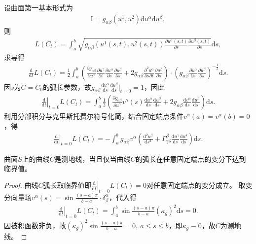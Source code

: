 \documentclass[../../main.tex]{subfiles}%
\begin{document}
设曲面第一基本形式为
\begin{align}
\mathrm{I}=g_{\alpha\beta}(u^1,u^2)\mathrm{d}u^\alpha\mathrm{d}u^\beta,
\end{align}
则
\begin{align}
L(C_t)=\int_{a}^{b}\sqrt{g_{\alpha\beta}(u^1(s,t),u^2(s,t))\frac{\partial u^\alpha(s,t)}{\partial s}\frac{\partial u^\beta(s,t)}{\partial s}}\mathrm{d}s,
\end{align}
求导得
\begin{align*}
\frac{\mathrm{d}}{\mathrm{d}t}L(C_t)=\frac{1}{2}\int_{a}^{b}\left(\frac{\partial g_{\alpha\beta}}{\partial u^\gamma}\frac{\partial u^\gamma}{\partial t}\frac{\partial u^\alpha}{\partial s}\frac{\partial u^\beta}{\partial s}+2g_{\alpha\beta}\frac{\partial^2u^\alpha}{\partial s\partial t}\frac{\partial u^\beta}{\partial s}\right)\cdot\left(g_{\alpha\beta}\frac{\partial u^\alpha}{\partial s}\frac{\partial u^\beta}{\partial s}\right)^{-\frac{1}{2}}\mathrm{d}s.
\end{align*}
因$s$为$C=C_0$的弧长参数，故$g_{\alpha\beta}\frac{\mathrm{d}u^\alpha}{\mathrm{d}s}\frac{\mathrm{d}u^\beta}{\mathrm{d}s}\big|_{t=0}=1$，因此
\begin{align*}
\left.\frac{\mathrm{d}}{\mathrm{d}t}\right|_{t=0}L(C_t)=\int_{a}^{b}\frac{1}{2}\left(\frac{\partial g_{\alpha\beta}}{\partial u^\gamma}v^\gamma(s)\frac{\mathrm{d}u^\alpha}{\mathrm{d}s}\frac{\mathrm{d}u^\beta}{\mathrm{d}s}+2g_{\alpha\beta}\frac{\mathrm{d}v^\alpha}{\mathrm{d}s}\frac{\mathrm{d}u^\beta}{\mathrm{d}s}\right)\mathrm{d}s.
\end{align*}
利用分部积分与克里斯托费尔符号化简，结合固定端点条件$v^\alpha(a)=v^\alpha(b)=0$，得
\begin{align}
\left.\frac{\mathrm{d}}{\mathrm{d}t}\right|_{t=0}L(C_t)=-\int_{a}^{b}g_{\alpha\beta}v^\alpha\left(\frac{\mathrm{d}^2u^\beta}{\mathrm{d}s^2}+\Gamma^\beta_{\gamma\delta}\frac{\mathrm{d}u^\gamma}{\mathrm{d}s}\frac{\mathrm{d}u^\delta}{\mathrm{d}s}\right)\mathrm{d}s.
\end{align}

\begin{theorem}
曲面$S$上的曲线$C$是测地线，当且仅当曲线$C$的弧长在任意固定端点的变分下达到临界值。
\end{theorem}

\begin{proof}

曲线$C$弧长取临界值即$\left.\frac{\mathrm{d}}{\mathrm{d}t}\right|_{t=0}L(C_t)=0$对任意固定端点的变分成立。
取变分向量场$v^\alpha(s)=\sin\frac{(s-a)\pi}{b-a}\cdot\delta^\alpha_\beta$，代入得
\begin{align*}
\left.\frac{\mathrm{d}}{\mathrm{d}t}\right|_{t=0}L(C_t)=\int_{a}^{b}\sin\frac{(s-a)\pi}{b-a}(\kappa_g)^2\mathrm{d}s=0.
\end{align*}
因被积函数非负，故$(\kappa_g)^2\sin\frac{(s-a)\pi}{b-a}=0,\ a\leqslant s\leqslant b$，即$\kappa_g\equiv0$，故$C$为测地线。

\end{proof}
\end{document}
